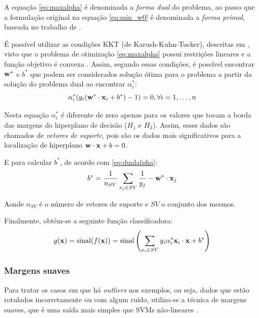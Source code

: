 A equação \ref{eq:maxalpha} é denominada a \emph{forma dual} do problema, ao passo que a formulação original na equação \ref{eq:min_w0} é denominada a \emph{forma primal}, baseada no trabalho de .

É possível utilizar as condições KKT (de Karush-Kuhn-Tucker), descritas em , visto que o problema de otimização \ref{eq:maxalpha} possui restrições lineares e a função objetivo é convexa \cite{burges1998tutorial}. Assim, segundo essas condições, é possível encontrar $\mathbf{w^*}$ e $b^*$ que podem ser considerados solução ótima para o problema a partir da solução do problema dual ao encontrar $\alpha_i^*$:
\begin{equation}\label{eq:dualalpha}
  \alpha_i^*(y_i(\mathbf{w^*}\cdot\mathbf{x}_i+b^*) - 1) = 0, \forall{i}=1,\dotsc,n
\end{equation}

Nesta equação $\alpha_i^*$ é diferente de zero apenas para os valores que tocam a borda das margens do hiperplano de decisão ($H_1$ e $H_2$). Assim, esses dados são chamados de \emph{vetores de suporte}, pois são os dados mais significativos para a localização de hiperplano $\mathbf{w}\cdot\mathbf{x} + b = 0$.

E para calcular $b^*$, de acordo com \ref{eq:dualalpha}:
\begin{equation}\nonumber
  b^* = \frac{1}{n_{SV}}\sum_{x_j \in SV}{\frac{1}{y_j} - \mathbf{w^*}\cdot\mathbf{x}_j}
\end{equation}

Aonde $n_{SV}$ é o número de vetores de suporte e $SV$ o conjunto dos mesmos.

Finalmente, obtém-se a seguinte função classificadora:
\begin{equation}\label{eq:classificadora}
  g(\mathbf{x}) = \operatorname{sinal}(f(\mathbf{x}))
              = \operatorname{sinal}\left(
                  \sum_{x_i \in SV}{y_i\alpha_i^*\mathbf{x}_i\cdot\mathbf{x}+b^*}
                \right)
\end{equation}

\subsubsection{Margens suaves}


Para tratar os casos em que há \emph{outliers} nos exemplos, ou seja, dados que estão rotulados incorretamente ou com algum ruído, utiliza-se a técnica de margens suaves, que é uma saída mais simples que SVMs não-lineares \cite{burges1998tutorial}.

